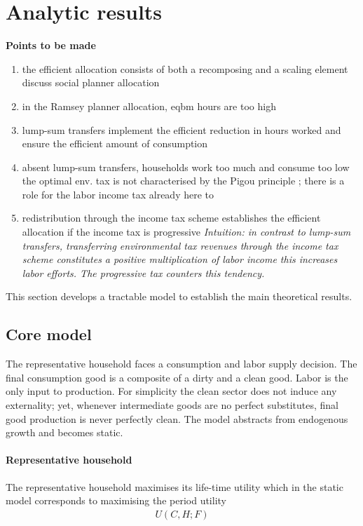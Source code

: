\section{Analytic results}
\textbf{Points to be made}
\begin{enumerate}
\item the efficient allocation consists of both a recomposing and a scaling element \ar discuss social planner allocation \checkmark
\item in the Ramsey planner allocation, eqbm hours are too high
\item lump-sum transfers implement the efficient reduction in hours worked and ensure the efficient amount of consumption \checkmark
\item absent lump-sum transfers, households work too much and consume too low \ar the optimal env. tax is not characterised by the Pigou principle  \checkmark;  there is a role for the labor income tax already here to 
\item redistribution through the income tax scheme establishes the efficient allocation if the income tax is progressive \textit{Intuition: in contrast to lump-sum transfers, transferring environmental tax revenues through the income tax scheme constitutes a positive multiplication of labor income \ar this increases labor efforts. The progressive tax counters this tendency.} \checkmark
\end{enumerate}

This section develops a tractable model to establish the main theoretical results. %

\subsection{Core model}
The representative household faces a consumption and labor supply decision. The final consumption good is a composite of a dirty and a clean good. Labor is the only input to production. For simplicity the clean sector does not induce any externality; yet, whenever intermediate goods are no perfect substitutes, final good production is never perfectly clean. The model abstracts from endogenous growth and becomes static. 

\paragraph{Representative household}
The representative household maximises its life-time utility which in the static model corresponds to maximising the period utility
\begin{align}
U(C,H; F)
\end{align} 

